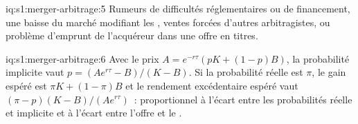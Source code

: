 \begin{solution}{iq:s1:merger-arbitrage:5}
Rumeurs de difficultés réglementaires ou de financement, une baisse du marché modifiant les , ventes forcées d'autres arbitragistes, ou
problème d'emprunt de l'acquéreur dans une offre en titres.
\end{solution}

\begin{solution}{iq:s1:merger-arbitrage:6}
Avec le prix $A = e^{-r\tau}(pK + (1 - p)B)$, la probabilité implicite vaut $p = (Ae^{r\tau} - B)/(K - B)$. Si la probabilité réelle est $\pi$, le gain espéré est
$\pi K + (1 - \pi)B$ et le rendement excédentaire espéré vaut $(\pi - p)(K - B)/(Ae^{r\tau})$~: proportionnel à l'écart entre les probabilités réelle et implicite
et à l'écart entre l'offre et le .
\end{solution}
